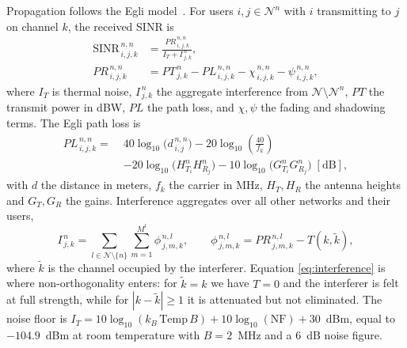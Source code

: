 \documentclass[journal]{IEEEtran}
\begin{document}
Propagation follows the Egli model~\cite{egli1957radio}. For users
$i,j\in\mathcal{N}^{n}$ with $i$ transmitting to $j$ on channel $k$, the
received SINR is
\begin{equation}
\begin{aligned}
\mathrm{SINR}^{\,n,n}_{\,i,j,k} &=
   \frac{PR^{\,n,n}_{\,i,j,k}}{I_{T} + I^{\,n}_{\,j,k}},\\
PR^{\,n,n}_{\,i,j,k} &= PT^{\,n}_{\,j,k} - PL^{\,n,n}_{\,i,j,k}
   - \chi^{\,n,n}_{\,i,j,k} - \psi^{\,n,n}_{\,i,j,k},
\end{aligned}
\label{eq:sinr}
\end{equation}
where $I_{T}$ is thermal noise, $I^{\,n}_{\,j,k}$ the aggregate interference
from $\mathcal{N}\setminus\mathcal{N}^{n}$, $PT$ the transmit power in dBW,
$PL$ the path loss, and $\chi,\psi$ the fading and shadowing terms. The Egli
path loss is
\begin{align}
PL^{\,n,n}_{\,i,j,k} =\;
 & 40\log_{10}\!\bigl(d^{\,n,n}_{\,i,j}\bigr)
 - 20\log_{10}\!\left(\frac{40}{f_{k}}\right) \nonumber\\
 & - 20\log_{10}\!\bigl(H^{n}_{T_{i}} H^{n}_{R_{j}}\bigr)
   - 10\log_{10}\!\bigl(G^{n}_{T_{i}} G^{n}_{R_{j}}\bigr)\;[\mathrm{dB}],
\label{eq:egli}
\end{align}
with $d$ the distance in meters, $f_{k}$ the carrier in MHz, $H_{T},H_{R}$ the
antenna heights and $G_{T},G_{R}$ the gains. Interference aggregates over all
other networks and their users,
\begin{equation}
I^{\,n}_{\,j,k} =\!\!\sum_{l\in\mathcal{N}\setminus\{n\}}
   \sum_{m=1}^{M^{l}}\! \phi^{\,n,l}_{\,j,m,k},
\qquad
\phi^{\,n,l}_{\,j,m,k} = PR^{\,n,l}_{\,j,m,k} - T(k,\tilde{k}),
\label{eq:interference}
\end{equation}
where $\tilde{k}$ is the channel occupied by the interferer. Equation
\eqref{eq:interference} is where non-orthogonality enters: for $\tilde{k}=k$ we
have $T=0$ and the interferer is felt at full strength, while for
$|k-\tilde{k}|\geq 1$ it is attenuated but not eliminated. The noise floor is
$I_{T}=10\log_{10}(k_{B}\,\mathrm{Temp}\,B)+10\log_{10}(\mathrm{NF})+30$~dBm,
equal to $-104.9$~dBm at room temperature with $B=2$~MHz and a $6$~dB noise
figure.
\end{document}
